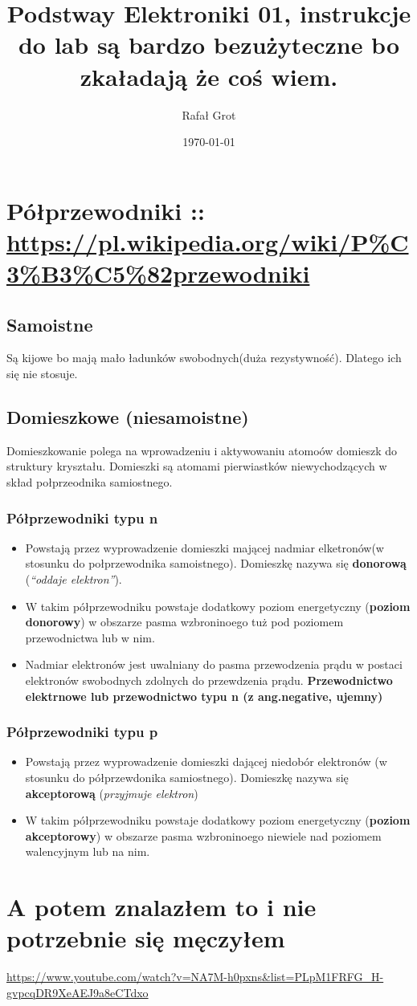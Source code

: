 \documentclass[11pt]{article}
\author{Rafał Grot}
\date{\today}
\title{Podstway Elektroniki 01, instrukcje do lab są bardzo bezużyteczne bo zkaładają że coś wiem.}
\begin{document}
\maketitle
\tableofcontents


\section{Półprzewodniki :: \url{https://pl.wikipedia.org/wiki/P\%C3\%B3\%C5\%82przewodniki}}
\label{sec:orgf0e440d}
\subsection{Samoistne}
\label{sec:orgaf0e739}
Są kijowe bo mają mało ładunków swobodnych(duża rezystywność).
Dlatego ich się nie stosuje.
\subsection{Domieszkowe (niesamoistne)}
\label{sec:orgd7ea2db}
Domieszkowanie polega na wprowadzeniu i aktywowaniu atomoów domieszk do struktury kryształu. Domieszki są atomami pierwiastków niewychodzących w skład połprzeodnika samiostnego.
\subsubsection{Półprzewodniki typu n}
\label{sec:orgfb6cdbe}
\begin{itemize}
\item Powstają przez wyprowadzenie domieszki mającej nadmiar elketronów(w stosunku do połprzewodnika samoistnego). Domieszkę nazywa się \textbf{donorową} (\emph{``oddaje elektron''}).
\item W takim półprzewodniku powstaje dodatkowy poziom energetyczny (\textbf{poziom donorowy}) w obszarze pasma wzbroninoego tuż pod poziomem przewodnictwa lub w nim.
\item Nadmiar elektronów jest uwalniany do pasma przewodzenia prądu w postaci elektronów swobodnych zdolnych do przewdzenia prądu. \textbf{Przewodnictwo elektrnowe lub przewodnictwo typu n (z ang.negative, ujemny)}
\end{itemize}
\subsubsection{Półprzewodniki typu p}
\label{sec:orgc4ffbca}
\begin{itemize}
\item Powstają przez wyprowadzenie domieszki dającej niedobór elektronów (w stosunku do półprzewdonika samiostnego). Domieszkę nazywa się \textbf{akceptorową} (\emph{przyjmuje elektron})
\item W takim półprzewodniku powstaje dodatkowy poziom energetyczny (\textbf{poziom akceptorowy}) w obszarze pasma wzbroninoego niewiele nad poziomem walencyjnym lub na nim.
\end{itemize}
\section{A potem znalazłem to i nie potrzebnie się męczyłem}
\label{sec:org48eb157}
\url{https://www.youtube.com/watch?v=NA7M-h0pxns\&list=PLpM1FRFG\_H-gvpcqDR9XeAEJ9a8eCTdxo}
\end{document}
